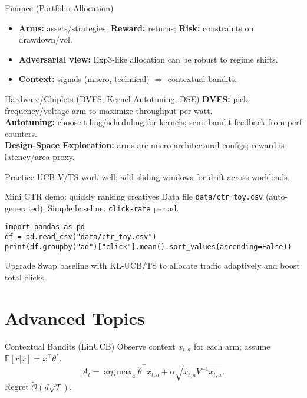 \documentclass[aspectratio=169]{beamer}
\newcommand{\E}{\mathbb{E}}
\newcommand{\cO}{\mathcal{O}}
\DeclareMathOperator*{\argmax}{arg\,max}
\begin{document}
\begin{frame}{Finance (Portfolio Allocation)}
\small
\begin{itemize}
  \item \textbf{Arms:} assets/strategies; \textbf{Reward:} returns; \textbf{Risk:} constraints on drawdown/vol.
  \item \textbf{Adversarial view:} Exp3-like allocation can be robust to regime shifts.
  \item \textbf{Context:} signals (macro, technical) $\Rightarrow$ contextual bandits.
\end{itemize}
\end{frame}

\begin{frame}{Hardware/Chiplets (DVFS, Kernel Autotuning, DSE)}
\small
\textbf{DVFS:} pick frequency/voltage arm to maximize throughput per watt.\\
\textbf{Autotuning:} choose tiling/scheduling for kernels; semi-bandit feedback from perf counters.\\
\textbf{Design-Space Exploration:} arms are micro-architectural configs; reward is latency/area proxy.\\
\begin{block}{Practice}
UCB-V/TS work well; add sliding windows for drift across workloads.
\end{block}
\end{frame}

\begin{frame}[fragile]{Mini CTR demo: quickly ranking creatives}
\small
Data file \texttt{data/ctr_toy.csv} (auto-generated). Simple baseline: \texttt{click-rate} per ad.
\begin{verbatim}
import pandas as pd
df = pd.read_csv("data/ctr_toy.csv")
print(df.groupby("ad")["click"].mean().sort_values(ascending=False))
\end{verbatim}
\begin{block}{Upgrade}
Swap baseline with KL-UCB/TS to allocate traffic adaptively and boost total clicks.
\end{block}
\end{frame}

\section{Advanced Topics}

\begin{frame}{Contextual Bandits (LinUCB)}
\small
Observe context $x_{t,a}$ for each arm; assume $\E[r|x]=x^\top \theta^*$.
\[
A_t=\argmax_a \hat{\theta}^\top x_{t,a} + \alpha \sqrt{x_{t,a}^\top V^{-1} x_{t,a}}.
\]
Regret $\tilde{\cO}(d\sqrt{T})$.
\end{frame}
\end{document}
